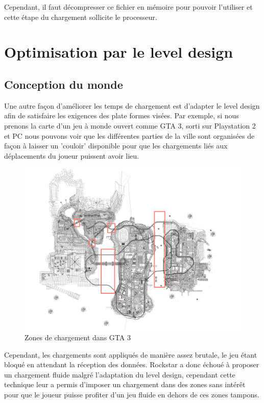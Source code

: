 \documentclass[a4paper, 11pt]{article} %
\begin{document}
Cependant, il faut décompresser ce fichier en mémoire pour pouvoir l'utiliser et cette étape du chargement sollicite le processeur.


\newpage
\section*{Optimisation par le level design}
\subsection*{Conception du monde}
Une autre façon d'améliorer les temps de chargement est d'adapter le level design afin de satisfaire les exigences des plate formes visées. Par exemple, si nous prenons la carte d'un jeu à monde ouvert comme GTA 3, sorti sur Playstation 2 et PC nous pouvons voir que les différentes parties de la ville sont organisées de façon à laisser un 'couloir' disponible pour que les chargements liés aux déplacements du joueur puissent avoir lieu.

\begin{figure}[!h]%
\includegraphics[width=\columnwidth]{images/gta3_map.png}%
\caption{Zones de chargement dans GTA 3}%
\label{}%
\end{figure}

Cependant, les chargements sont appliqués de manière assez brutale, le jeu étant bloqué en attendant la réception des données. Rockstar a donc échoué à proposer un chargement fluide malgré l'adaptation du level design, cependant cette technique leur a permis d'imposer un chargement dans des zones sans intérêt pour que le joueur puisse profiter d'un jeu fluide en dehors de ces zones tampons.
\end{document}
